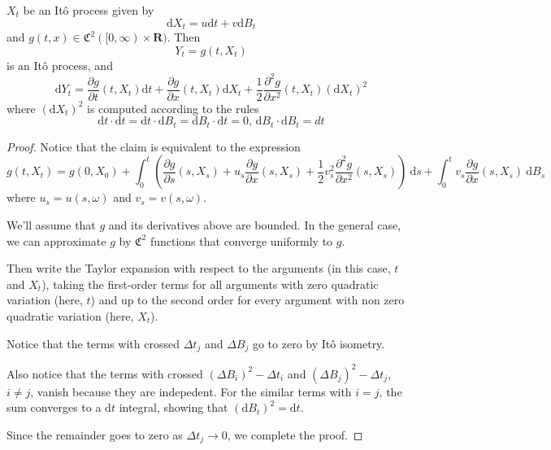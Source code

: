 \begin{theorem}
    $X_t$ be an Itô process given by 
    \begin{equation*}
        \mathrm{d}X_t = u \mathrm{d}t + v \mathrm{d}B_t
    \end{equation*}
    and $g(t,x) \in \mathfrak{C}^2([0, \infty) \times \textbf{R})$. Then 
    \[
        Y_t = g(t, X_t)
    \]
    is an Itô process, and
    \begin{equation}
        \mathrm{d}Y_t = \frac{\partial g}{\partial t}(t, X_t) \mathrm{d}t + \frac{\partial g}{\partial x}(t, X_t) \mathrm{d}X_t + \frac{1}{2}\frac{\partial^2 g}{\partial x^2}(t, X_t)(\mathrm{d}X_t)^2
    \end{equation}
    where $(\mathrm{d}X_t)^2$ is computed according to the rules
    \[
        \mathrm{d}t \cdot \mathrm{d}t = \mathrm{d}t \cdot \mathrm{d}B_t = \mathrm{d}B_t \cdot \mathrm{d}t = 0, \, \mathrm{d}B_t \cdot \mathrm{d}B_t = dt
    \]
\end{theorem}

\begin{proof}
    Notice that the claim is equivalent to the expression  
    \[
        g(t, X_t) = g(0, X_0) + \int_0^t \left( \frac{\partial g}{\partial s}(s, X_s) + u_s \frac{\partial g}{\partial x} (s, X_s) + \frac{1}{2} v_s^2 \frac{\partial^2 g}{\partial x^2} (s, X_s) \right) ~\mathrm{d}s + \int_0^t v_s \frac{\partial g}{\partial x} (s, X_s) ~\mathrm{d}B_s
    \]
    where $u_s = u(s, \omega)$ and $v_s = v(s, \omega)$. 

    We'll assume that $g$ and its derivatives above are bounded. In the general case, we can approximate $g$ by $\mathfrak{C}^2$ functions that converge uniformly to $g$.

    Then write the Taylor expansion with respect to the arguments (in this case, $t$ and $X_t$), taking the first-order terms for all arguments with zero quadratic variation (here, $t$) and up to the second order for every argument with non zero quadratic variation (here, $X_t$).

    Notice that the terms with crossed $\Delta t_j$ and $\Delta B_j$ go to zero by Itô isometry.
    
    Also notice that the terms with crossed $(\Delta B_i)^2 - \Delta t_i$ and $(\Delta B_j)^2 - \Delta t_j$, $i \neq j$, vanish because they are indepedent. For the similar terms with $i = j$, the sum converges to a $\mathrm{d}t$ integral, showing that $(\mathrm{d} B_t)^2 = \mathrm{d}t$. 

    Since the remainder goes to zero as $\Delta t_j \to 0$, we complete the proof.
\end{proof}

